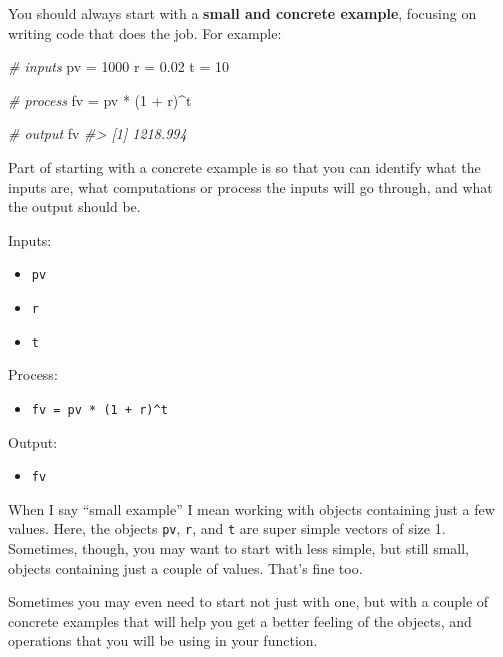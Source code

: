 \documentclass[
]{book}
\newenvironment{Shaded}{\begin{snugshade}}{\end{snugshade}}
\newcommand{\CommentTok}[1]{\textcolor[rgb]{0.56,0.35,0.01}{\textit{#1}}}
\newcommand{\DecValTok}[1]{\textcolor[rgb]{0.00,0.00,0.81}{#1}}
\newcommand{\FloatTok}[1]{\textcolor[rgb]{0.00,0.00,0.81}{#1}}
\newcommand{\NormalTok}[1]{#1}
\newcommand{\OtherTok}[1]{\textcolor[rgb]{0.56,0.35,0.01}{#1}}
\newcommand{\SpecialCharTok}[1]{\textcolor[rgb]{0.00,0.00,0.00}{#1}}
\providecommand{\tightlist}{%
  \setlength{\itemsep}{0pt}\setlength{\parskip}{0pt}}
\begin{document}
You should always start with a \textbf{small and concrete example}, focusing
on writing code that does the job. For example:

\begin{Shaded}
\begin{Highlighting}[]
\CommentTok{\# inputs}
\NormalTok{pv }\OtherTok{=} \DecValTok{1000}
\NormalTok{r }\OtherTok{=} \FloatTok{0.02}
\NormalTok{t }\OtherTok{=} \DecValTok{10}

\CommentTok{\# process}
\NormalTok{fv }\OtherTok{=}\NormalTok{ pv }\SpecialCharTok{*}\NormalTok{ (}\DecValTok{1} \SpecialCharTok{+}\NormalTok{ r)}\SpecialCharTok{\^{}}\NormalTok{t}

\CommentTok{\# output}
\NormalTok{fv}
\CommentTok{\#\textgreater{} [1] 1218.994}
\end{Highlighting}
\end{Shaded}

Part of starting with a concrete example is so that you can identify what the
inputs are, what computations or process the inputs will go through, and what
the output should be.

Inputs:

\begin{itemize}
\tightlist
\item
  \texttt{pv}
\item
  \texttt{r}
\item
  \texttt{t}
\end{itemize}

Process:

\begin{itemize}
\tightlist
\item
  \texttt{fv\ =\ pv\ *\ (1\ +\ r)\^{}t}
\end{itemize}

Output:

\begin{itemize}
\tightlist
\item
  \texttt{fv}
\end{itemize}

When I say ``small example'' I mean working with objects containing just a few
values. Here, the objects \texttt{pv}, \texttt{r}, and \texttt{t} are super simple vectors of size 1.
Sometimes, though, you may want to start with less simple, but still small,
objects containing just a couple of values. That's fine too.

Sometimes you may even need to start not just with one, but with a couple of
concrete examples that will help you get a better feeling of the objects, and
operations that you will be using in your function.
\end{document}
